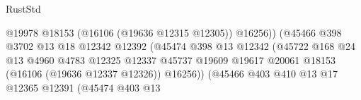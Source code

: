 \begin{lexlean}{RustStd}
\begin{coremodule}
                                                          @19978
                                                          @18153
                                                          (@16106 (@19636 @12315 @12305))
                                                          @16256))
                                                      (@45466
                                                        @398
                                                        @3702
                                                        @13
                                                        @18
                                                        @12342
                                                        @12392
                                                        (@45474
                                                          @398
                                                          @13
                                                          @12342
                                                          (@45722
                                                            @168
                                                            @24
                                                            @13
                                                            @4960
                                                            @4783
                                                            @12325
                                                            @12337
                                                            @45737
                                                            @19609
                                                            @19617
                                                            @20061
                                                            @18153
                                                            (@16106 (@19636 @12337 @12326))
                                                            @16256))
                                                        (@45466
                                                          @403
                                                          @410
                                                          @13
                                                          @17
                                                          @12365
                                                          @12391
                                                          (@45474
                                                            @403
                                                            @13

\end{coremodule}
\end{lexlean}
